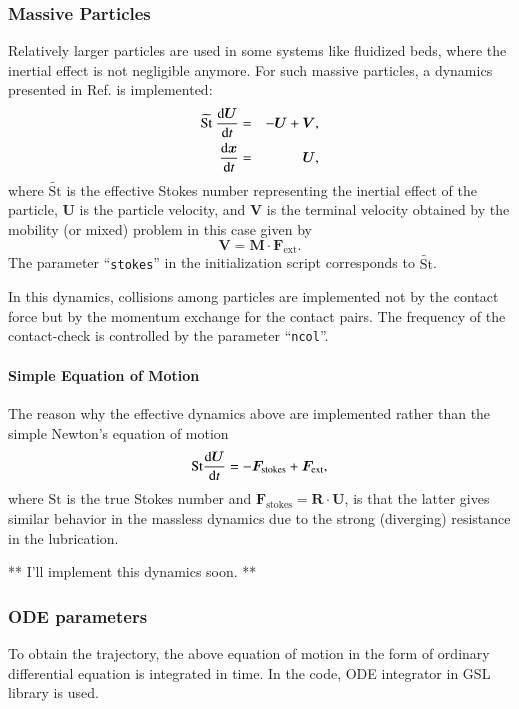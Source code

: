 \documentclass{book}
\begin{document}
\subsubsection{Massive Particles}
Relatively larger particles are used in some systems like fluidized beds,
where the inertial effect is not negligible anymore.
For such massive particles,
a dynamics presented in Ref. \cite{IchikiHayakawa1995,IchikiHayakawa1998}
is implemented:
\begin{eqnarray}
  \widetilde{\text{St}}\ 
  \frac{{\rm d}\bm{U}}{{\rm d}t}
  &=&
  -\bm{U}+\bm{V}
  ,
  \\
  \frac{{\rm d}\bm{x}}{{\rm d}t}
  &=&
  \bm{U}
  ,
\end{eqnarray}
where $\widetilde{\text{St}}$ is the effective Stokes number
representing the inertial effect of the particle,
$\bm{U}$ is the particle velocity, and
$\bm{V}$ is the terminal velocity obtained
by the mobility (or mixed) problem in this case given by
\begin{equation}
  \bm{V}
  =
  \bm{M}\cdot\bm{F}_{\text{ext}}
  .
\end{equation}
The parameter ``{\tt stokes}'' in the initialization script 
corresponds to $\widetilde{\text{St}}$.


In this dynamics, collisions among particles are implemented 
not by the contact force but by the momentum exchange
for the contact pairs. The frequency of the contact-check 
is controlled by the parameter ``{\tt ncol}''.


\paragraph{Simple Equation of Motion}
The reason why the effective dynamics above are implemented
rather than the simple Newton's equation of motion
\begin{equation}
  \text{St}
  \frac{{\rm d}\bm{U}}{{\rm d}t}
  =
  -\bm{F}_{\text{stokes}}
  +\bm{F}_{\text{ext}}
  ,
\end{equation}
where $\text{St}$ is the true Stokes number
and $\bm{F}_{\text{stokes}} = \bm{R}\cdot\bm{U}$,
is that
the latter gives similar behavior in the massless dynamics
due to the strong (diverging) resistance in the lubrication.
\cite{IchikiHayakawa1998}

** I'll implement this dynamics soon. **


\subsubsection{ODE parameters}
To obtain the trajectory, the above equation of motion
in the form of ordinary differential equation
is integrated in time.
In the code, ODE integrator in GSL library\cite{GSL} is used.
\end{document}
